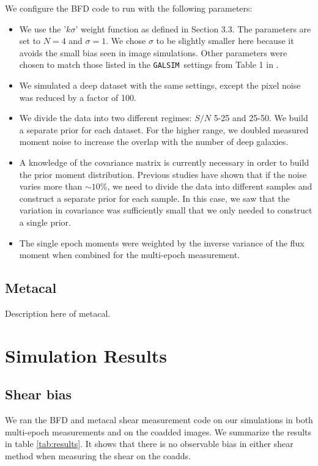 \documentclass[fleqn,useAMS,usenatbib]{mnras}
\newcommand{\galsim}{\texttt{GALSIM}}
\begin{document}
We configure the BFD code to run with the following parameters:
\begin{itemize}
\item We use the '$k\sigma$' weight function as defined in \cite{Bernstein2016} Section 3.3.  The parameters are set to $N=4$ and $\sigma=1$.  We chose $\sigma$ to be slightly smaller here because it avoids the small bias seen in image simulations.  Other parameters were chosen to match those listed in the \galsim\ settings from Table 1 in \cite{Bernstein2016}.
\item We simulated a deep dataset with the same settings, except the pixel noise was reduced by a factor of 100.
\item We divide the data into two different regimes: $S/N$ 5-25 and 25-50.  We build a separate prior for each dataset.  For the higher range, we doubled measured moment noise to increase the overlap with the number of deep galaxies.
\item A knowledge of the covariance matrix is currently necessary in order to build the prior moment distribution.  Previous studies have shown that if the noise varies more than $\sim 10\%$, we need to divide the data into different samples and construct a separate prior for each sample.  In this case, we saw that the variation in covariance was sufficiently small that we only needed to construct a single prior.
\item The single epoch moments were weighted by the inverse variance of the flux moment when combined for the multi-epoch measurement.  
\end{itemize}

\subsection{Metacal}
\label{Section:Metacal}

Description here of metacal.

\section{Simulation Results}
\label{Section:Results}
\subsection{Shear bias}
We ran the BFD and metacal shear measurement code on our simulations in both multi-epoch measurements and on the coadded images. We summarize the results in table \ref{tab:results}.  It shows that there is no observable bias in either shear method when measuring the shear on the coadds.  
\end{document}
